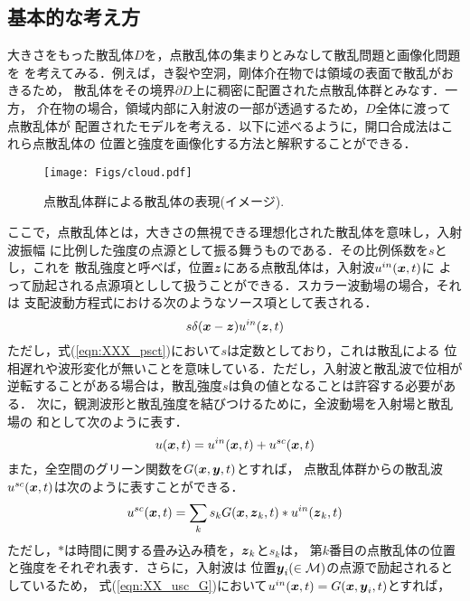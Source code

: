 \subsection{基本的な考え方}
大きさをもった散乱体$D$を，点散乱体の集まりとみなして散乱問題と画像化問題を
を考えてみる．例えば，き裂や空洞，剛体介在物では領域の表面で散乱がおきるため，
散乱体をその境界$\partial D$上に稠密に配置された点散乱体群とみなす．一方，
介在物の場合，領域内部に入射波の一部が透過するため，$D$全体に渡って点散乱体が
配置されたモデルを考える．以下に述べるように，開口合成法はこれら点散乱体の
位置と強度を画像化する方法と解釈することができる．
\begin{figure}[h]
	\begin{center}
	\texttt{[image: Figs/cloud.pdf]} 
	\end{center}
	\caption{点散乱体群による散乱体の表現(イメージ).} 
	\label{fig:XXX_cloud}
\end{figure}
ここで，点散乱体とは，大きさの無視できる理想化された散乱体を意味し，入射波振幅
に比例した強度の点源として振る舞うものである．その比例係数を$s$とし，これを
散乱強度と呼べば，位置$\mbox{\boldmath $z$}$にある点散乱体は，入射波$u^{in}(\mbox{\boldmath $x$},t)$に
よって励起される点源項としして扱うことができる．スカラー波動場の場合，それは
支配波動方程式における次のようなソース項として表される．
\begin{equation}
	s\delta (\mbox{\boldmath $x$}-\mbox{\boldmath $z$})u^{in}(\mbox{\boldmath $z$},t)
	\label{eqn:XXX_psct}
\end{equation}
ただし，式(\ref{eqn:XXX_psct})において$s$は定数としており，これは散乱による
位相遅れや波形変化が無いことを意味している．ただし，入射波と散乱波で位相が
逆転することがある場合は，散乱強度$s$は負の値となることは許容する必要がある．
次に，観測波形と散乱強度を結びつけるために，全波動場を入射場と散乱場の
和として次のように表す．
\begin{equation}
	u(\mbox{\boldmath $x$},t)=u^{in}(\mbox{\boldmath $x$},t)+u^{sc}(\mbox{\boldmath $x$},t)
	\label{eqn:XXX_utot}
\end{equation}
また，全空間のグリーン関数を$G(\mbox{\boldmath $x$},\mbox{\boldmath $y$},t)$とすれば，
点散乱体群からの散乱波$u^{sc}(\mbox{\boldmath $x$},t)$は次のように表すことができる．
\begin{equation}
	u^{sc}(\mbox{\boldmath $x$},t)=\sum_k s_k G(\mbox{\boldmath $x$},\mbox{\boldmath $z$}_k,t)*u^{in}(\mbox{\boldmath $z$}_k,t)
	\label{eqn:XXX_usc_G}
\end{equation}
ただし，$*$は時間に関する畳み込み積を，$\mbox{\boldmath $z$}_k$と$s_k$は，
第$k$番目の点散乱体の位置と強度をそれぞれ表す．さらに，入射波は
位置$\mbox{\boldmath $y$}_i(\in {\cal M})$の点源で励起されるとしているため，
式(\ref{eqn:XX_usc_G})において$u^{in}(\mbox{\boldmath $x$},t)=G(\mbox{\boldmath $x$},\mbox{\boldmath $y$}_i,t)$とすれば，
